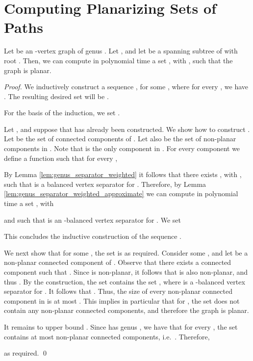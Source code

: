 \documentclass[envcountsect]{llncs}
\begin{document}
\section{Computing Planarizing Sets of Paths}

\begin{lemma}\label{lem:computing_planarizing_paths}
Let  be an -vertex graph of genus .
Let , and let  be a spanning subtree of  with root .
Then, we can compute in polynomial time a set , with , such that the graph  is planar.
\end{lemma}
\begin{proof}
We inductively construct a sequence , for some , where for every , we have .
The resulting desired set will be .

For the basis of the induction, we set .

Let , and suppose that  has already been constructed.
We show how to construct .
Let  be the set of connected components of .
Let also  be the set of non-planar components in .
Note that  is the only component in .
For every component  we define a function  such that for every ,

By Lemma \ref{lem:genus_separator_weighted} it follows that there exists , with , such that  is a balanced vertex separator for .
Therefore, by Lemma \ref{lem:genus_separator_weighted_approximate} we can compute in polynomial time a set , with 

and such that  is an -balanced vertex separator for .
We set

This concludes the inductive construction of the sequence .

We next show that for some , the set  is as required.
Consider some , and let  be a non-planar connected component of .
Observe that there exists a connected component  such that .
Since  is non-planar, it follows that  is also non-planar, and thus .
By the construction, the set  contains the set , where  is 
a -balanced vertex separator for .
It follows that .
Thus, the size of every non-planar connected component in  is at most .
This implies in particular that for , the set  does not contain any non-planar connected components, and therefore the graph  is planar.

It remains to upper bound .
Since  has genus , we have that for every , the set  contains at most  non-planar connected components, i.e.~.
Therefore,

as required.
\qed
\end{proof}
\end{document}
